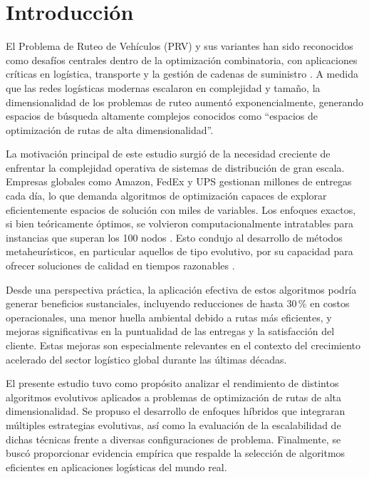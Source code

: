 \documentclass[10pt,a4paper]{article}
\begin{document}
\vspace{5em}



\section{Introducción}

El Problema de Ruteo de Vehículos (PRV) y sus variantes han sido reconocidos como desafíos centrales dentro de la optimización combinatoria, con aplicaciones críticas en logística, transporte y la gestión de cadenas de suministro \cite{toth2014}. A medida que las redes logísticas modernas escalaron en complejidad y tamaño, la dimensionalidad de los problemas de ruteo aumentó exponencialmente, generando espacios de búsqueda altamente complejos conocidos como ``espacios de optimización de rutas de alta dimensionalidad''.

La motivación principal de este estudio surgió de la necesidad creciente de enfrentar la complejidad operativa de sistemas de distribución de gran escala. Empresas globales como Amazon, FedEx y UPS gestionan millones de entregas cada día, lo que demanda algoritmos de optimización capaces de explorar eficientemente espacios de solución con miles de variables. Los enfoques exactos, si bien teóricamente óptimos, se volvieron computacionalmente intratables para instancias que superan los 100 nodos \cite{applegate2007}. Esto condujo al desarrollo de métodos metaheurísticos, en particular aquellos de tipo evolutivo, por su capacidad para ofrecer soluciones de calidad en tiempos razonables \cite{blum2003}.

Desde una perspectiva práctica, la aplicación efectiva de estos algoritmos podría generar beneficios sustanciales, incluyendo reducciones de hasta 30\,\% en costos operacionales, una menor huella ambiental debido a rutas más eficientes, y mejoras significativas en la puntualidad de las entregas y la satisfacción del cliente. Estas mejoras son especialmente relevantes en el contexto del crecimiento acelerado del sector logístico global durante las últimas décadas.

El presente estudio tuvo como propósito analizar el rendimiento de distintos algoritmos evolutivos aplicados a problemas de optimización de rutas de alta dimensionalidad. Se propuso el desarrollo de enfoques híbridos que integraran múltiples estrategias evolutivas, así como la evaluación de la escalabilidad de dichas técnicas frente a diversas configuraciones de problema. Finalmente, se buscó proporcionar evidencia empírica que respalde la selección de algoritmos eficientes en aplicaciones logísticas del mundo real.
\end{document}
